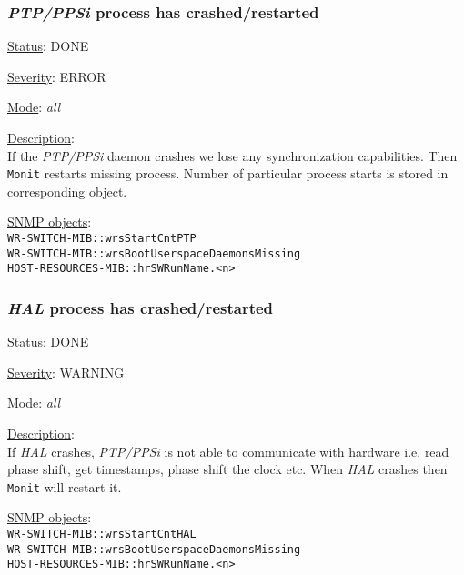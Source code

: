 \subsubsection{\bf \emph{PTP/PPSi} process has crashed/restarted}
		\label{fail:timing:ppsi_crash}
		\begin{packed_enum}
			\item [] \underline{Status}: DONE
			\item [] \underline{Severity}: ERROR
			\item [] \underline{Mode}: \emph{all}
			\item [] \underline{Description}:\\
				If the \emph{PTP/PPSi} daemon crashes we lose any synchronization
				capabilities. Then \texttt{Monit} restarts missing process.
				Number of particular process starts is stored in corresponding object.
			\item [] \underline{SNMP objects}:\\
				\texttt{WR-SWITCH-MIB::wrsStartCntPTP}\\
				\texttt{WR-SWITCH-MIB::wrsBootUserspaceDaemonsMissing}\\
				\texttt{HOST-RESOURCES-MIB::hrSWRunName.<n>}
		\end{packed_enum}

\subsubsection{\bf \emph{HAL} process has crashed/restarted}
		\label{fail:timing:hal_crash}
		\begin{packed_enum}
			\item [] \underline{Status}: DONE
			\item [] \underline{Severity}: WARNING
			\item [] \underline{Mode}: \emph{all}
			\item [] \underline{Description}:\\
				If \emph{HAL} crashes, \emph{PTP/PPSi} is not able to communicate with
				hardware i.e. read phase shift, get timestamps, phase shift the clock
				etc. When \emph{HAL} crashes then \texttt{Monit} will restart it.
			\item [] \underline{SNMP objects}:\\
				\texttt{WR-SWITCH-MIB::wrsStartCntHAL}\\
				\texttt{WR-SWITCH-MIB::wrsBootUserspaceDaemonsMissing}\\
				\texttt{HOST-RESOURCES-MIB::hrSWRunName.<n>}
		\end{packed_enum}

